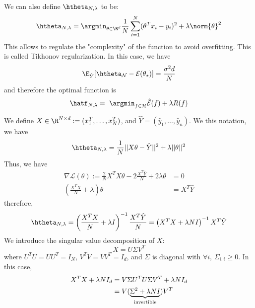 \documentclass[toc]{../cs-classes/cs-classes}
\begin{document}
We can also define $\htheta_{N, \lambda}$ to be:
\begin{equation*}
    \htheta_{N, \lambda} = \argmin_{\theta\in\R^d} \frac{1}{N} \sum_{i=1}^N (\theta^Tx_i-y_i)^2 + \lambda\norm{\theta}^2
\end{equation*}
This allows to regulate the "complexity" of the function to avoid overfitting. This is called Tikhonov regularization. In this case, we have
\begin{equation*}
    \E_{\hat{Y}}[\mathcal{\htheta_N} - \mathcal{E}(\theta_\star)] = \frac{\sigma^2 d}{N}
\end{equation*}
and therefore the optimal function is 
\begin{equation*}
    \hatf_{N, \lambda} = \argmin_{f\in\mathcal{H}} \hat{\mathcal{E}}(f) + \lambda R(f)
\end{equation*}

We define $X\in\R^{N\times d} := (x_1^T, \dots, x_N^T)$, and $\hat{Y}=(\hat{y}_1, \dots, \hat{y}_n)$. We this notation, we have
\begin{equation*}
    \htheta_{N, \lambda} = \frac{1}{N}||X\theta-\hat{Y}||^2 + \lambda||\theta||^2
\end{equation*}
Thus, we have
\begin{equation*}
    \begin{aligned}
        \nabla\mathcal{L}(\theta) := \frac{2}{N}X^TX\theta - 2\frac{X^T\hat{Y}}{N}+2\lambda\theta &= 0\\
        (\frac{X^TX}{N}+\lambda)\theta &= X^T\hat{Y}
    \end{aligned}
\end{equation*}
therefore,
\begin{equation*}
    \htheta_{N, \lambda} = \left(\frac{X^TX}{N}+\lambda I\right)^{-1}\frac{X^T\hat{Y}}{N} = \left(X^TX+\lambda N I\right)^{-1}X^T\hat{Y}
\end{equation*}
We introduce the singular value decomposition of $X$:
\begin{equation*}
    X = U\Sigma V^T
\end{equation*}
where $U^TU = UU^T = I_N$, $V^TV = VV^T=I_d$, and $\Sigma$ is diagonal with $\forall i, \,\Sigma_{i, i} \geq 0$.
In this case,
\begin{equation*}
\begin{aligned}
    X^TX + \lambda NI_d &= V\Sigma U^T U \Sigma V^T + \lambda N I_d\\
    &= V(\underbrace{\Sigma^2 + \lambda N I}_{\textnormal{invertible}}) V^T
\end{aligned}
\end{equation*}
\end{document}
